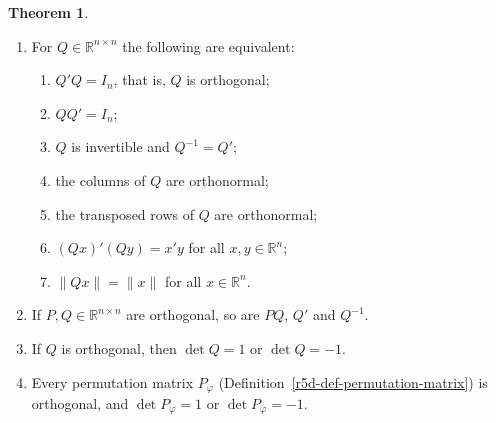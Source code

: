 \documentclass[12pt]{article}
\newcommand{\R}{\mathbb R}
\theoremstyle{definition}
\newtheorem{theorem}{Theorem}
\begin{document}
\begin{theorem}\label{r6-thm-orthogonal}
\begin{enumerate}
\item For \(Q\in\R^{n\times n}\) the following are equivalent:
\begin{enumerate}[label=(\roman*)]
\item \(Q'Q=I_n\), that is, \(Q\) is orthogonal;
\item \(QQ'=I_n\);
\item \(Q\) is invertible and \(Q^{-1}=Q'\);
\item the columns of \(Q\) are orthonormal;
\item the transposed rows of \(Q\) are orthonormal;
\item \((Qx)'(Qy)=x'y\) for all \(x,y\in\R^n\);
\item \(\lVert Qx\rVert=\lVert x\rVert\) for all \(x\in\R^n\).
\end{enumerate}
\item If \(P,Q\in\R^{n\times n}\) are orthogonal, so are \(PQ\), \(Q'\) and \(Q^{-1}\).
\item If \(Q\) is orthogonal, then \(\det Q=1\) or \(\det Q=-1\).
\item Every permutation matrix \(P_\varphi\) (Definition~\ref{r5d-def-permutation-matrix}) is orthogonal, and
\(\det P_\varphi=1\) or \(\det P_\varphi=-1\).
\end{enumerate}
\end{theorem}
\end{document}
